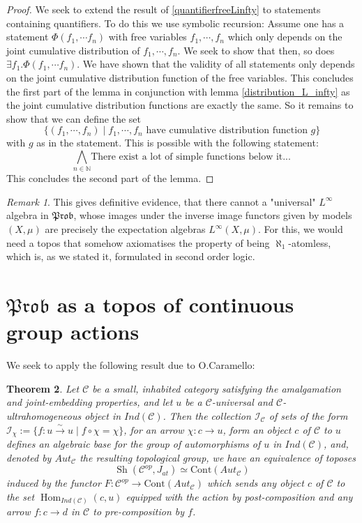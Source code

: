 \documentclass[a4paper]{amsproc}
\theoremstyle{plain}
\newtheorem{theorem}{Theorem}[section]
\theoremstyle{definition}
\theoremstyle{remark}
\newtheorem{remark}[theorem]{Remark}
\numberwithin{equation}{section}
\DeclareMathOperator{\Hom}{Hom}
\DeclareMathOperator{\Sh}{Sh}
\newcommand{\C}{\mathcal{C}}
\newcommand{\Prob}{\mathfrak{Prob}}
\begin{document}
\begin{proof}
We seek to extend the result of \ref{quantifierfreeLinfty} to statements containing quantifiers. To do this we use symbolic recursion:\newline
\indent Assume one has a statement $\Phi(f_1,\cdots f_n)$ with free variables $f_1,\cdots, f_n$ which only depends on the joint cumulative distribution of $f_1,\cdots, f_n$. We seek to show that then, so does $\exists f_1.\Phi(f_1,\cdots f_n)$. \newline
\indent We have shown that the validity of all statements only depends on the joint cumulative distribution function of the free variables. This concludes the first part of the lemma in conjunction with lemma \ref{distribution_L_infty} as the joint cumulative distribution functions are exactly the same.\newline
\indent So it remains to show that we can define the set
\[\{(f_1,\cdots,f_n)\mid f_1,\cdots,f_n \text{ have cumulative distribution function }g \} \]
 with $g$ as in the statement. This is possible with the following statement:
 \[\bigwedge_{n\in \mathbb{N}}\text{There exist a lot of simple functions below it...} \]
This concludes the second part of the lemma.
\end{proof}
\begin{remark} This gives definitive evidence, that there cannot a "universal" $L^\infty$ algebra in $\Prob$, whose images under the inverse image functors given by models $(X,\mu)$ are precisely the expectation algebras $L^\infty(X,\mu)$. For this, we would need a topos that somehow axiomatises the property of being $\aleph_1$-atomless, which is, as we stated it, formulated in second order logic.
\end{remark}
\section{$\Prob$ as a topos of continuous group actions}

We seek to apply the following result due to O.Caramello:

\begin{theorem}\label{olivia}
Let $\C$ be a small, inhabited category satisfying the amalgamation and joint-embedding properties, and let $u$ be a $\C$-universal and $\C$-ultrahomogeneous object in $Ind(\C)$. Then the collection $\mathcal{I}_{\C}$ of sets of the form $\mathcal{I}_{\chi}:=\{f:u\overset{\sim}{\rightarrow} u\mid  f\circ \chi=\chi\} $, for an arrow $\chi:c\rightarrow u$, form an object $c$ of $\C$ to $u$ defines an algebraic base for the group of automorphisms of $u$ in $Ind(\C)$, and, denoted by $Aut_\C$ the resulting topological group, we have an equivalence of toposes
\[\Sh(\C^{op},J_{at})\simeq \text{Cont}(Aut_\C) \]
induced by the functor $F:\C^{op}\rightarrow \text{Cont}(Aut_{\C})$ which sends any object $c$ of $\C$ to the set $\Hom_{Ind(\C)}(c,u)$ equipped with the action by post-composition and any arrow $f:c\rightarrow d$ in $\C$ to pre-composition by $f$.
\end{theorem}
\end{document}
